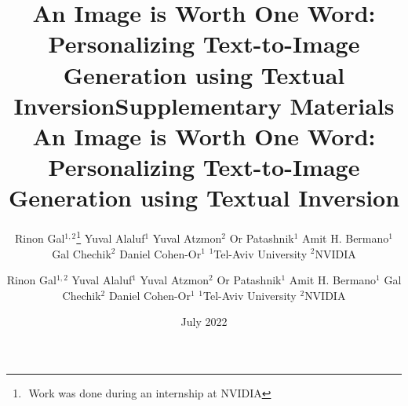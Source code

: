 \documentclass{article}
\title{An Image is Worth One Word: Personalizing Text-to-Image Generation using Textual Inversion}
\author{Rinon Gal$^{1,2}$\thanks{\,\,Work was done during an internship at NVIDIA} \And Yuval Alaluf$^{1}$ \And Yuval Atzmon$^{2}$ \And Or Patashnik$^{1}$ \vspace{-20pt} \AND Amit H. Bermano$^{1}$ \And Gal Chechik$^{2}$ \And Daniel Cohen-Or$^{1}$ \vspace{-15pt} \AND
$^{1}$Tel-Aviv University \And $^{2}$NVIDIA}
\date{July 2022}
\begin{document}
\maketitle












\clearpage

\title{Supplementary Materials \\ An Image is Worth One Word: Personalizing Text-to-Image Generation using Textual Inversion}
\author{Rinon Gal$^{1,2}$ \And Yuval Alaluf$^{1}$ \And Yuval Atzmon$^{2}$ \And Or Patashnik$^{1}$ \AND \vspace{-12pt} Amit H. Bermano$^{1}$ \And Gal Chechik$^{2}$ \And Daniel Cohen-Or$^{1}$ \AND \vspace{-17pt}
$^{1}$Tel-Aviv University \And $^{2}$NVIDIA}

\settitle

\appendix
\vspace{-15pt}

\end{document}
